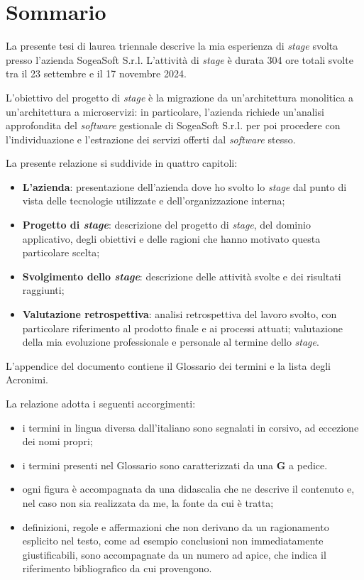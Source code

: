 \chapter*{Sommario}
\vspace{0.5cm}
\noindent La presente tesi di laurea triennale descrive la mia esperienza di \textit{stage} svolta presso l'azienda SogeaSoft S.r.l. L'attività di \textit{stage} è durata 304 ore totali svolte tra il 23 settembre e il 17 novembre 2024. 

\vspace{0.5 em}
\noindent L'obiettivo del progetto di \textit{stage} è la migrazione da un'architettura monolitica a un'architettura a microservizi: in particolare, l'azienda richiede un'analisi approfondita del \textit{software} gestionale di SogeaSoft S.r.l. per poi procedere con l'individuazione e l'estrazione dei servizi offerti dal \textit{software} stesso. 

\vspace{0.5 em}
\noindent La presente relazione si suddivide in quattro capitoli:
\begin{itemize}
    \item \textbf{L'azienda}: presentazione dell'azienda dove ho svolto lo \textit{stage} dal punto di vista delle tecnologie utilizzate e dell'organizzazione interna;
    \item \textbf{Progetto di \textit{stage}}: descrizione del progetto di \textit{stage}, del dominio applicativo, degli obiettivi e delle ragioni che hanno motivato questa particolare scelta;
    \item \textbf{Svolgimento dello \textit{stage}}: descrizione delle attività svolte e dei risultati raggiunti;
    \item \textbf{Valutazione retrospettiva}: analisi retrospettiva del lavoro svolto, con particolare riferimento al prodotto finale e ai processi attuati; valutazione della mia evoluzione professionale e personale al termine dello \textit{stage}.
   \end{itemize}

\noindent L'appendice del documento contiene il Glossario dei termini e la lista degli Acronimi. 

\vspace{0.5 em}
\noindent La relazione adotta i seguenti accorgimenti:
\begin{itemize}
    \item i termini in lingua diversa dall'italiano sono segnalati in corsivo, ad eccezione dei nomi propri;
    \item i termini presenti nel Glossario sono caratterizzati da una \textbf{G} a pedice. 
    \item ogni figura è accompagnata da una didascalia che ne descrive il contenuto e, nel caso non sia realizzata da me, la fonte da cui è tratta;
    \item definizioni, regole e affermazioni che non derivano da un ragionamento esplicito nel testo, come ad esempio conclusioni non immediatamente giustificabili, sono accompagnate da un numero ad apice, che indica il riferimento bibliografico da cui provengono. 
\end{itemize}

\clearpage